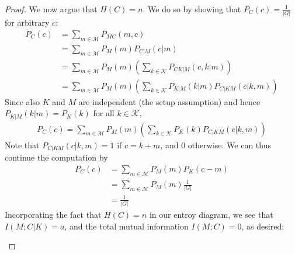 \begin{proof}
We now argue that $H(C) = n$. We do so by showing that $P_C(c) = \frac{1}{|G|}$ for arbitrary $c$: 
\begin{align}
P_C(c) &= \sum_{m \in \mathcal{M}} P_{MC}(m,c)\nonumber\\
&= \sum_{m \in \mathcal{M}} P_M(m) P_{C|M}(c|m)\nonumber\\
&= \sum_{m \in \mathcal{M}} P_M(m) \left(\sum_{k \in \mathcal{K}} P_{CK|M}(c,k|m)\right)\nonumber\\
&= \sum_{m \in \mathcal{M}} P_M(m) \left(\sum_{k \in \mathcal{K}} P_{K|M}(k|m) P_{C|KM}(c|k,m)\right)
\end{align}
Since also $K$ and $M$ are independent (the setup assumption) and hence $P_{K|M}(k|m) = P_K(k)$ for all $k \in \mathcal{K}$,
\begin{align}
P_C(c) = \sum_{m \in \mathcal{M}} P_M(m) \left(\sum_{k \in \mathcal{K}} P_{K}(k) P_{C|KM}(c|k,m)\right)
\end{align}
Note that $P_{C|KM}(c|k,m) = 1$ if $c = k + m$, and 0 otherwise. We can thus continue the computation by
\begin{align}
P_C(c) &= \sum_{m \in \mathcal{M}} P_M(m) P_K(c - m)\nonumber\\
&= \sum_{m \in \mathcal{M}} P_M(m) \frac{1}{|G|}\nonumber\\
&= \frac{1}{|G|}
\end{align}
Incorporating the fact that $H(C) = n$ in our entroy diagram, we see that $I(M;C|K) = a$, and the total mutual information $I(M;C) = 0$, as desired:
\begin{center}
\end{center}


\end{proof}
